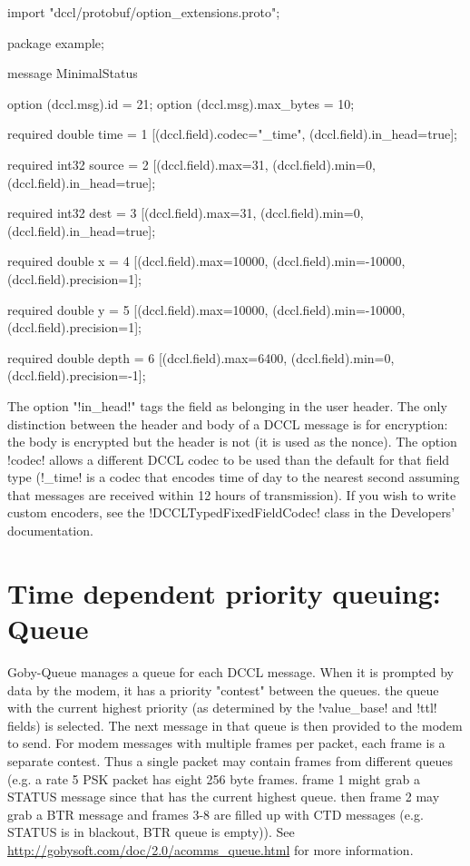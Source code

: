 \begin{boxedverbatim}
import "dccl/protobuf/option_extensions.proto";

package example;

message MinimalStatus
{ 
  option (dccl.msg).id = 21;
  option (dccl.msg).max_bytes = 10;

  required double time = 1 [(dccl.field).codec="_time",
                            (dccl.field).in_head=true];
  
  required int32 source = 2 [(dccl.field).max=31,
                             (dccl.field).min=0,
                             (dccl.field).in_head=true];

  required int32 dest = 3 [(dccl.field).max=31,
                           (dccl.field).min=0,
                           (dccl.field).in_head=true];
  
  required double x = 4 [(dccl.field).max=10000,
                         (dccl.field).min=-10000,
                         (dccl.field).precision=1];
  
  required double y = 5 [(dccl.field).max=10000,
                         (dccl.field).min=-10000,
                         (dccl.field).precision=1];
  
  required double depth = 6 [(dccl.field).max=6400,
                             (dccl.field).min=0,
                             (dccl.field).precision=-1];
} 
\end{boxedverbatim}
\resetbvlinenumber

The option "!in_head!" tags the field as belonging in the user header. The only distinction between the header and body of a DCCL message is for encryption: the body is encrypted but the header is not (it is used as the nonce). The option !codec! allows a different DCCL codec to be used than the default for that field type (!_time! is a codec that encodes time of day to the nearest second assuming that messages are received within 12 hours of transmission). If you wish to write custom encoders, see the !DCCLTypedFixedFieldCodec! class in the Developers' documentation.

\section{Time dependent priority queuing: Queue} \label{sec:queue}

Goby-Queue manages a queue for each DCCL message. When it is prompted by data by the modem, it has a priority "contest" between the queues. the queue with the current highest priority (as determined by the !value_base! and !ttl! fields) is selected. The next message in that queue is then provided to the modem to send. For modem messages with multiple frames per packet, each frame is a separate contest. Thus a single packet may contain frames from different
 queues (e.g. a rate 5 PSK packet has eight 256 byte frames. frame 1 might grab a STATUS message since that has the current highest queue. then frame 2 may grab a BTR message and frames 3-8 are filled up with CTD messages (e.g. STATUS is in blackout, BTR queue is empty)). See \url{http://gobysoft.com/doc/2.0/acomms_queue.html} for more information.

